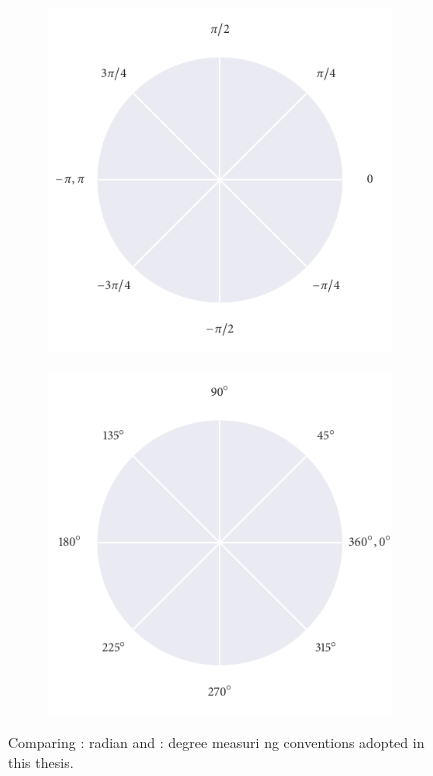 \begin{figure}
\centering
	\begin{subfigure}[b]{0.5\textwidth}
		\includegraphics{radian_axes.pdf}
		\caption{}
		\label{subfig:radian_axes}
	\end{subfigure}%
	\begin{subfigure}[b]{0.5\textwidth}
		\centering
		\includegraphics{degree_axes.pdf}
		\caption{}
		\label{subfig:degree_axes}
	\end{subfigure}
	\caption{Comparing : radian and : degree measuri
ng conventions adopted in this thesis.}
	\label{fig:compare_axes}
\end{figure}


